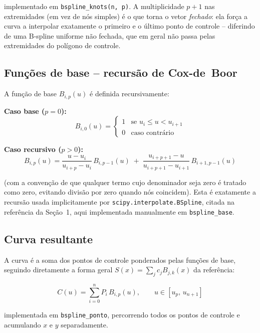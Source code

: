 \documentclass[11pt,a4paper]{article}
\begin{document}
implementado em \texttt{bspline\_knots(n, p)}. A multiplicidade $p+1$ nas
extremidades (em vez de nós simples) é o que torna o vetor \emph{fechado}: ela
força a curva a interpolar exatamente o primeiro e o último ponto de
controle -- diferindo de uma B-spline uniforme não fechada, que em geral não
passa pelas extremidades do polígono de controle.

\subsection{Funções de base -- recursão de Cox-de~Boor}

A função de base $B_{i,p}(u)$ é definida recursivamente:

\textbf{Caso base ($p=0$):}
\begin{equation}
B_{i,0}(u) = \begin{cases} 1 & \text{se } u_i \le u < u_{i+1} \\ 0 & \text{caso contrário} \end{cases}
\end{equation}

\textbf{Caso recursivo ($p>0$):}
\begin{equation}
B_{i,p}(u) = \frac{u - u_i}{u_{i+p} - u_i}\, B_{i,p-1}(u) \;+\; \frac{u_{i+p+1} - u}{u_{i+p+1} - u_{i+1}}\, B_{i+1,p-1}(u)
\label{eq:coxdeboor}
\end{equation}

(com a convenção de que qualquer termo cujo denominador seja zero é tratado
como zero, evitando divisão por zero quando nós coincidem). Esta é exatamente
a recursão usada implicitamente por \texttt{scipy.interpolate.BSpline}, citada
na referência da Seção~1, aqui implementada manualmente em
\texttt{bspline\_base}.

\subsection{Curva resultante}

A curva é a soma dos pontos de controle ponderados pelas funções de base,
seguindo diretamente a forma geral $S(x) = \sum_j c_j B_{j,k}(x)$ da
referência:

\begin{equation}
C(u) = \sum_{i=0}^{n} P_i \, B_{i,p}(u), \qquad u \in [u_p,\, u_{n+1}]
\label{eq:bspline}
\end{equation}

implementada em \texttt{bspline\_ponto}, percorrendo todos os pontos de
controle e acumulando $x$ e $y$ separadamente.
\end{document}
